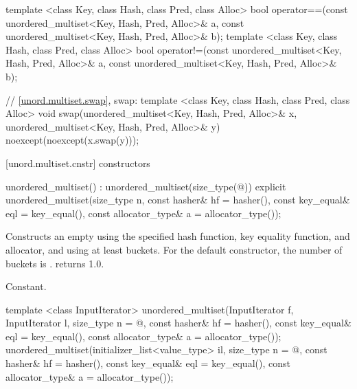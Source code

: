\begin{codeblock}
{  template <class Key, class Hash, class Pred, class Alloc>
    bool operator==(const unordered_multiset<Key, Hash, Pred, Alloc>& a,
                    const unordered_multiset<Key, Hash, Pred, Alloc>& b);
  template <class Key, class Hash, class Pred, class Alloc>
    bool operator!=(const unordered_multiset<Key, Hash, Pred, Alloc>& a,
                    const unordered_multiset<Key, Hash, Pred, Alloc>& b);

  // \ref{unord.multiset.swap}, swap:
  template <class Key, class Hash, class Pred, class Alloc>
    void swap(unordered_multiset<Key, Hash, Pred, Alloc>& x,
              unordered_multiset<Key, Hash, Pred, Alloc>& y)
      noexcept(noexcept(x.swap(y)));
}
\end{codeblock}

[unord.multiset.cnstr]{ constructors}

%
\begin{itemdecl}
unordered_multiset() : unordered_multiset(size_type(@\seebelow@)) { }
explicit unordered_multiset(size_type n,
                            const hasher& hf = hasher(),
                            const key_equal& eql = key_equal(),
                            const allocator_type& a = allocator_type());
\end{itemdecl}

\begin{itemdescr}
\pnum
\effects Constructs an empty  using the
specified hash function, key equality function, and allocator, and
using at least  buckets.  For the default constructor,
the number of buckets is .
 returns 1.0.

\pnum
\complexity Constant.
\end{itemdescr}

%
\begin{itemdecl}
template <class InputIterator>
  unordered_multiset(InputIterator f, InputIterator l,
                     size_type n = @\seebelow@,
                     const hasher& hf = hasher(),
                     const key_equal& eql = key_equal(),
                     const allocator_type& a = allocator_type());
unordered_multiset(initializer_list<value_type> il,
                   size_type n = @\seebelow@,
                   const hasher& hf = hasher(),
                   const key_equal& eql = key_equal(),
                   const allocator_type& a = allocator_type());
\end{itemdecl}

